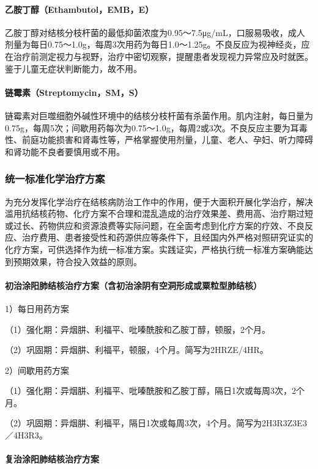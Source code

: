 \paragraph{乙胺丁醇（Ethambutol，EMB，E）}

乙胺丁醇对结核分枝杆菌的最低抑菌浓度为0.95～7.5μg/mL，口服易吸收，成人剂量为每日0.75～1.0g，每周3次用药为每日1.0～1.25g。不良反应为视神经炎，应在治疗前测定视力与视野，治疗中密切观察，提醒患者发现视力异常应及时就医。鉴于儿童无症状判断能力，故不用。
\paragraph{链霉素（Streptomycin，SM，S）}

链霉素对巨噬细胞外碱性环境中的结核分枝杆菌有杀菌作用。肌内注射，每日量为0.75g，每周5次；间歇用药每次为0.75～1.0g，每周2或3次。不良反应主要为耳毒性、前庭功能损害和肾毒性等，严格掌握使用剂量，儿童、老人、孕妇、听力障碍和肾功能不良者要慎用或不用。

\subsubsection{统一标准化学治疗方案}

为充分发挥化学治疗在结核病防治工作中的作用，便于大面积开展化学治疗，解决滥用抗结核药物、化疗方案不合理和混乱造成的治疗效果差、费用高、治疗期过短或过长、药物供应和资源浪费等实际问题，在全面考虑到化疗方案的疗效、不良反应、治疗费用、患者接受性和药源供应等条件下，且经国内外严格对照研究证实的化疗方案，可供选择作为统一标准方案。实践证实，严格执行统一标准方案确能达到预期效果，符合投入效益的原则。
\paragraph{初治涂阳肺结核治疗方案（含初治涂阴有空洞形成或粟粒型肺结核）}

1）每日用药方案

（1）强化期：异烟肼、利福平、吡嗪酰胺和乙胺丁醇，顿服，2个月。

（2）巩固期：异烟肼、利福平，顿服，4个月。简写为2HRZE/4HR。

2）间歇用药方案

（1）强化期：异烟肼、利福平、吡嗪酰胺和乙胺丁醇，隔日1次或每周3次，2个月。

（2）巩固期：异烟肼、利福平，隔日1次或每周3次，4个月。简写为2H3R3Z3E3／4H3R3。
\paragraph{复治涂阳肺结核治疗方案}


